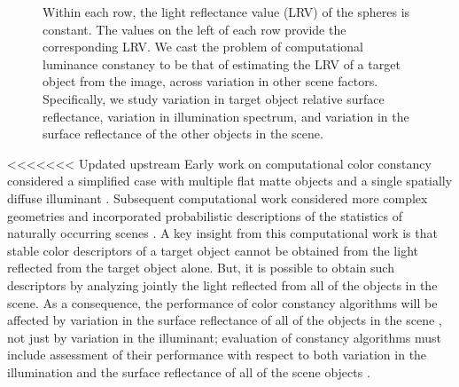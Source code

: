 \documentclass{jov}
\begin{document}
\begin{figure}
{Within each row, the light reflectance value (LRV) of the spheres is constant. The values on the left of each row provide the corresponding LRV. We cast the problem of computational luminance constancy to be that of estimating the LRV of a target object from the image, across variation in other scene factors. Specifically, we study variation in target object relative surface reflectance, variation in illumination spectrum, and variation in the surface reflectance of the other objects in the scene.}
 \end{figure}

<<<<<<< Updated upstream
Early work on computational color constancy considered a simplified case with multiple flat matte objects and a single spatially diffuse illuminant \cite{LandRetinex,Buchsbaum80,MaloneyWandell86}.
Subsequent computational work considered more complex geometries and incorporated probabilistic descriptions of the statistics of naturally occurring scenes \cite{funt1988color, D'ZmuraConstancy3, barron2012color, D'ZmuraIversonSinger,BrainardFreeman}.
A key insight from this computational work is that stable color descriptors of a target object cannot be obtained from the light reflected from the target object alone.
But, it is possible to obtain such descriptors by analyzing jointly the light reflected from all of the objects in the scene.
As a consequence, the performance of color constancy algorithms will be affected by variation in the surface reflectance of all of the objects in the scene \cite{BrainardWandellRetinex}, not just by variation in the illuminant; evaluation of constancy algorithms must include assessment of their performance with respect to both variation in the illumination and the surface reflectance of all of the scene objects \cite{BrainardWandellRetinex,BrainardFreeman}. 
\end{document}
